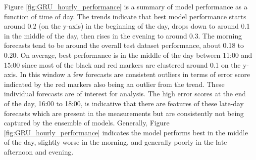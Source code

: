 Figure \ref{fig:GRU_hourly_performance} is a summary of model performance as a function of time of day. The trends indicate that best model performance starts around 0.2 (on the y-axis) in the beginning of the day, drops down to around 0.1 in the middle of the day, then rises in the evening to around 0.3. The morning forecasts tend to be around the overall test dataset performance, about 0.18 to 0.20. On average, best performance is in the middle of the day between 11:00 and 15:00 since most of the black and red markers are clustered around 0.1 on the y-axis. In this window a few forecasts are consistent outliers in terms of error score indicated by the red markers also being an outlier from the trend. These individual forecasts are of interest for analysis. The high error scores at the end of the day, 16:00 to 18:00, is indicative that there are features of these late-day forecasts which are present in the measurements but are consistently not being captured by the ensemble of models. Generally, Figure \ref{fig:GRU_hourly_performance} indicates the model performs best in the middle of the day, slightly worse in the morning, and generally poorly in the late afternoon and evening.


